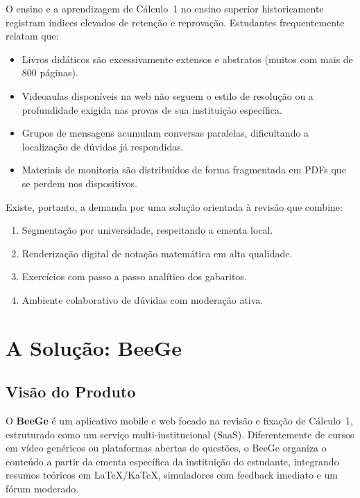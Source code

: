 \documentclass[12pt, a4paper]{article}
\begin{document}
O ensino e a aprendizagem de C\'{a}lculo~1 no ensino superior historicamente registram \'{i}ndices elevados de reten\c{c}\~{a}o e reprova\c{c}\~{a}o. Estudantes frequentemente relatam que:

\begin{itemize}[leftmargin=2cm]
  \item Livros did\'{a}ticos s\~{a}o excessivamente extensos e abstratos (muitos com mais de 800 p\'{a}ginas).
  \item Videoaulas dispon\'{i}veis na web n\~{a}o seguem o estilo de resolu\c{c}\~{a}o ou a profundidade exigida nas provas de sua institui\c{c}\~{a}o espec\'{i}fica.
  \item Grupos de mensagens acumulam conversas paralelas, dificultando a localiza\c{c}\~{a}o de d\'{u}vidas j\'{a} respondidas.
  \item Materiais de monitoria s\~{a}o distribu\'{i}dos de forma fragmentada em PDFs que se perdem nos dispositivos.
\end{itemize}

Existe, portanto, a demanda por uma solu\c{c}\~{a}o orientada \`{a} revis\~{a}o que combine:

\begin{enumerate}[leftmargin=2cm]
  \item Segmenta\c{c}\~{a}o por universidade, respeitando a ementa local.
  \item Renderiza\c{c}\~{a}o digital de nota\c{c}\~{a}o matem\'{a}tica em alta qualidade.
  \item Exerc\'{i}cios com passo a passo anal\'{i}tico dos gabaritos.
  \item Ambiente colaborativo de d\'{u}vidas com modera\c{c}\~{a}o ativa.
\end{enumerate}

\section{A Solu\c{c}\~{a}o: BeeGe}

\subsection{Vis\~{a}o do Produto}

O \textbf{BeeGe} \'{e} um aplicativo mobile e web focado na revis\~{a}o e fixa\c{c}\~{a}o de C\'{a}lculo~1, estruturado como um servi\c{c}o multi-institucional (SaaS). Diferentemente de cursos em v\'{i}deo gen\'{e}ricos ou plataformas abertas de quest\~{o}es, o BeeGe organiza o conte\'{u}do a partir da ementa espec\'{i}fica da institui\c{c}\~{a}o do estudante, integrando resumos te\'{o}ricos em \LaTeX/KaTeX, simuladores com feedback imediato e um f\'{o}rum moderado.
\end{document}
